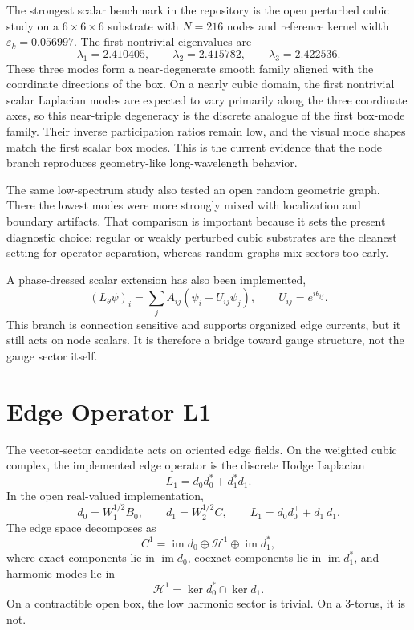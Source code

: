 \documentclass[11pt]{article}
\begin{document}
The strongest scalar benchmark in the repository is the open perturbed cubic study on a $6 \times 6 \times 6$ substrate with $N=216$ nodes and reference kernel width $\varepsilon_k = 0.056997$. The first nontrivial eigenvalues are
\begin{equation}
\lambda_1 = 2.410405,
\qquad
\lambda_2 = 2.415782,
\qquad
\lambda_3 = 2.422536.
\end{equation}
These three modes form a near-degenerate smooth family aligned with the coordinate directions of the box. On a nearly cubic domain, the first nontrivial scalar Laplacian modes are expected to vary primarily along the three coordinate axes, so this near-triple degeneracy is the discrete analogue of the first box-mode family. Their inverse participation ratios remain low, and the visual mode shapes match the first scalar box modes. This is the current evidence that the node branch reproduces geometry-like long-wavelength behavior.

The same low-spectrum study also tested an open random geometric graph. There the lowest modes were more strongly mixed with localization and boundary artifacts. That comparison is important because it sets the present diagnostic choice: regular or weakly perturbed cubic substrates are the cleanest setting for operator separation, whereas random graphs mix sectors too early.

A phase-dressed scalar extension has also been implemented,
\begin{equation}
(L_\theta \psi)_i = \sum_j A_{ij}(\psi_i - U_{ij}\psi_j),
\qquad
U_{ij} = e^{i\theta_{ij}}.
\end{equation}
This branch is connection sensitive and supports organized edge currents, but it still acts on node scalars. It is therefore a bridge toward gauge structure, not the gauge sector itself.

\section{Edge Operator L1}
The vector-sector candidate acts on oriented edge fields. On the weighted cubic complex, the implemented edge operator is the discrete Hodge Laplacian
\begin{equation}
L_1 = d_0 d_0^* + d_1^* d_1.
\end{equation}
In the open real-valued implementation,
\begin{equation}
d_0 = W_1^{1/2} B_0,
\qquad
d_1 = W_2^{1/2} C,
\qquad
L_1 = d_0 d_0^\top + d_1^\top d_1.
\end{equation}
The edge space decomposes as
\begin{equation}
C^1 = \operatorname{im} d_0 \oplus \mathcal{H}^1 \oplus \operatorname{im} d_1^*,
\end{equation}
where exact components lie in $\operatorname{im} d_0$, coexact components lie in $\operatorname{im} d_1^*$, and harmonic modes lie in
\begin{equation}
\mathcal{H}^1 = \ker d_0^* \cap \ker d_1.
\end{equation}
On a contractible open box, the low harmonic sector is trivial. On a $3$-torus, it is not.
\end{document}
